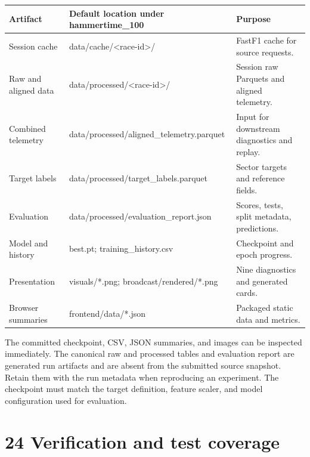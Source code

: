 \documentclass[11pt,a4paper,oneside]{report}
\begin{document}
\begin{center}\small\begin{tabularx}{\textwidth}{@{}>{\raggedright\arraybackslash}X>{\raggedright\arraybackslash}X>{\raggedright\arraybackslash}X@{}}

\toprule

Artifact & Default location under hammertime\_100 & Purpose \\

\midrule

Session cache & data/cache/<race-id>/ & FastF1 cache for source requests. \\

Raw and aligned data & data/processed/<race-id>/ & Session raw Parquets and aligned telemetry. \\

Combined telemetry & data/processed/aligned\_telemetry.parquet & Input for downstream diagnostics and replay. \\

Target labels & data/processed/target\_labels.parquet & Sector targets and reference fields. \\

Evaluation & data/processed/evaluation\_report.json & Scores, tests, split metadata, predictions. \\

Model and history & best.pt; training\_history.csv & Checkpoint and epoch progress. \\

Presentation & visuals/*.png; broadcast/rendered/*.png & Nine diagnostics and generated cards. \\

Browser summaries & frontend/data/*.json & Packaged static data and metrics. \\

\bottomrule\end{tabularx}\end{center}

The committed checkpoint, CSV, JSON summaries, and images can be inspected immediately. The canonical raw and processed tables and evaluation report are generated run artifacts and are absent from the submitted source snapshot. Retain them with the run metadata when reproducing an experiment. The checkpoint must match the target definition, feature scaler, and model configuration used for evaluation.

\clearpage

\clearpage\chapter*{24 Verification and test coverage}
\end{document}
